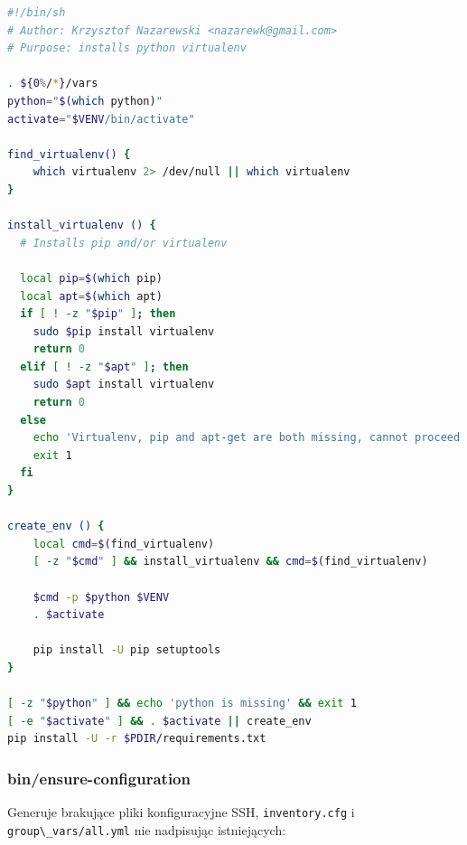 \documentclass[a4paper,12pt,twoside,openany]{report}
\newcommand{\passthrough}[1]{#1}
\begin{document}
\begin{lstlisting}[language=bash]
#!/bin/sh
# Author: Krzysztof Nazarewski <nazarewk@gmail.com>
# Purpose: installs python virtualenv

. ${0%/*}/vars
python="$(which python)"
activate="$VENV/bin/activate"

find_virtualenv() {
    which virtualenv 2> /dev/null || which virtualenv
}

install_virtualenv () {
  # Installs pip and/or virtualenv

  local pip=$(which pip)
  local apt=$(which apt)
  if [ ! -z "$pip" ]; then
    sudo $pip install virtualenv
    return 0
  elif [ ! -z "$apt" ]; then
    sudo $apt install virtualenv
    return 0
  else
    echo 'Virtualenv, pip and apt-get are both missing, cannot proceed'
    exit 1
  fi
}

create_env () {
    local cmd=$(find_virtualenv)
    [ -z "$cmd" ] && install_virtualenv && cmd=$(find_virtualenv)

    $cmd -p $python $VENV
    . $activate

    pip install -U pip setuptools
}

[ -z "$python" ] && echo 'python is missing' && exit 1
[ -e "$activate" ] && . $activate || create_env
pip install -U -r $PDIR/requirements.txt
\end{lstlisting}

\hypertarget{binensure-configuration}{%
\subsubsection{bin/ensure-configuration}\label{binensure-configuration}}

Generuje brakujące pliki konfiguracyjne SSH,
\passthrough{\lstinline!inventory.cfg!} i
\passthrough{\lstinline!group\_vars/all.yml!} nie nadpisując
istniejących:
\end{document}
